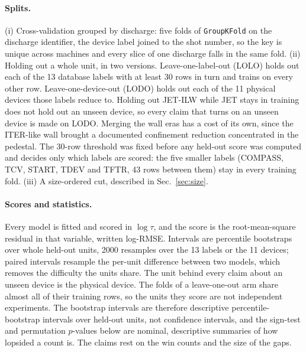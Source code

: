 \documentclass[aip,pop,preprint,amsmath,amssymb]{revtex4-2}
\begin{document}
\paragraph{Splits.} (i) Cross-validation grouped by discharge: five folds of
\texttt{GroupKFold} on the discharge identifier, the device label joined to
the shot number, so the key is unique across machines and every slice of one
discharge falls in the same fold. (ii) Holding out a whole unit, in two
versions. Leave-one-label-out (LOLO) holds out each of the 13 database labels
with at least 30 rows in turn and trains on every other row. Leave-one-device-out
(LODO) holds out each of the 11 physical devices those labels reduce to.
Holding out JET-ILW while JET stays in training does not hold out an unseen
device, so every claim that turns on an unseen device is made on LODO. Merging
the wall eras has a cost of its own, since the ITER-like wall brought a
documented confinement reduction concentrated in the pedestal\cite{leyland}.
The 30-row threshold was fixed before any held-out score was computed and
decides only which labels are scored: the five smaller labels (COMPASS, TCV,
START, TDEV and TFTR, 43 rows between them) stay in every training fold. (iii)
A size-ordered cut, described in Sec.~\ref{sec:size}.

\paragraph{Scores and statistics.} Every model is fitted and scored in
$\log\tau$, and the score is the root-mean-square residual in that variable,
written log-RMSE. Intervals are percentile bootstraps over whole held-out units,
2000 resamples over the 13 labels or the 11 devices; paired intervals resample
the per-unit difference between two models, which removes the difficulty the
units share. The unit behind every claim about an unseen device is the physical
device.
The folds of a leave-one-out arm share almost all of their training rows, so the
units they score are not independent experiments. The bootstrap intervals are
therefore descriptive percentile-bootstrap intervals over held-out units, not
confidence intervals, and the sign-test and permutation $p$-values below are
nominal, descriptive summaries of how lopsided a count is. The claims rest on
the win counts and the size of the gaps.

\end{document}
